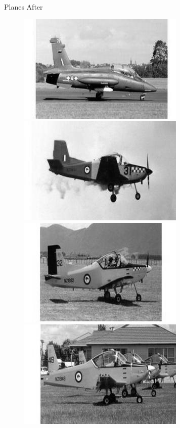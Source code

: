 \documentclass{beamer}
\begin{document}
\begin{frame}{Planes After}
  \begin{figure}
    \centering
    \includegraphics[scale=.4]{airplaners-image_0001.jpg}
    \includegraphics[scale=.4]{airplaners-image_0002.jpg} \\
    \includegraphics[scale=.4]{airplaners-image_0003.jpg}
    \includegraphics[scale=.4]{airplaners-image_0004.jpg}
  \end{figure}
\end{frame}
\end{document}
